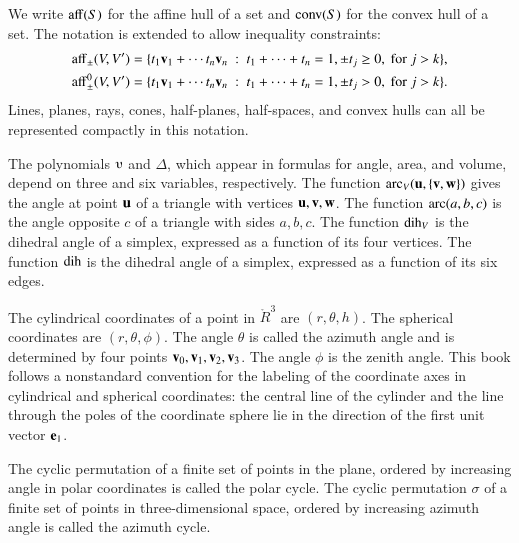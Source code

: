 We write ${\operatorname{aff}}(S)$ for the affine hull of a set and ${\operatorname{conv}}(S)$ for the convex hull of a set.
The notation is extended to allow inequality constraints:
	\begin{align*}
{\operatorname{aff}}_{\pm} (V,V') &= \{t_1 {\mathbf v}_1 +\cdots t_n {\mathbf v}_n \ :\ 
	t_1 +\cdots+t_n = 1, \pm t_j \ge 0, \text{ for } j>k\},\\
{\operatorname{aff}}^0_{\pm} (V,V') &= \{t_1 {\mathbf v}_1 +\cdots t_n {\mathbf v}_n \ :\ 
	t_1 +\cdots+t_n = 1, \pm t_j > 0, \text{ for } j>k\}.
\end{align*}
Lines, planes, rays, cones, half-planes, half-spaces, and convex hulls
can all be represented compactly in this notation.

The polynomials $\ups$ and $\Delta$, which appear in
formulas for angle, area, and volume, depend on three and six
variables, respectively.  The function $\operatorname{arc}_V({\mathbf u},\{{\mathbf v},{\mathbf w}\})$ gives
the angle at point ${\mathbf u}$ of a triangle with vertices ${\mathbf u},{\mathbf v},{\mathbf w}$.  The
function $\operatorname{arc}(a,b,c)$ is the angle opposite $c$ of a triangle with
sides $a,b,c$.  The function $\operatorname{dih}_V$ is the dihedral angle of a
simplex, expressed as a function of its four vertices.  The function
$\operatorname{dih}$ is the dihedral angle of a simplex, expressed as a function of
its six edges.

The cylindrical coordinates of a point in $\ring{R}^3$ are
$(r,\theta,h)$.  The spherical coordinates are $(r,\theta,\phi)$.  The
angle $\theta$ is called the azimuth angle and is determined by four
points ${\mathbf v}_0,{\mathbf v}_1,{\mathbf v}_2,{\mathbf v}_3$.  The angle $\phi$ is the zenith angle.
This book follows a nonstandard convention for the labeling of the
coordinate axes in cylindrical and spherical coordinates: the central
line of the cylinder and the line through the poles of the coordinate
sphere lie in the direction of the first unit vector ${\mathbf e}_1$.

The cyclic permutation of a finite set of points in the plane, ordered
by increasing angle in polar coordinates is called the polar cycle.
The cyclic permutation $\sigma$ of a finite set of points in
three-dimensional space, ordered by increasing azimuth angle is called
the azimuth cycle.


